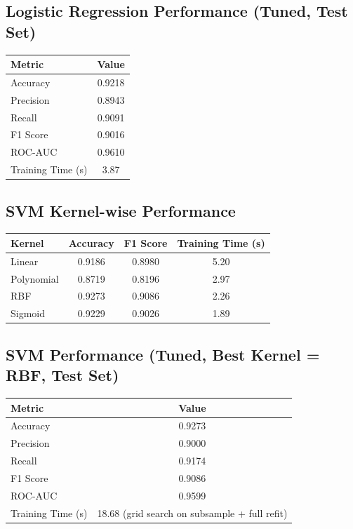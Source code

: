 \documentclass[12pt,a4paper]{article}
\begin{document}
\subsection*{Logistic Regression Performance (Tuned, Test Set)}
\begin{tabular}{lc}
\toprule
Metric & Value\\
\midrule
Accuracy & 0.9218 \\
Precision & 0.8943 \\
Recall & 0.9091 \\
F1 Score & 0.9016 \\
ROC-AUC & 0.9610 \\
Training Time (s) & 3.87 \\
\bottomrule
\end{tabular}

\subsection*{SVM Kernel-wise Performance}
\begin{tabular}{lccc}
\toprule
Kernel & Accuracy & F1 Score & Training Time (s)\\
\midrule
Linear & 0.9186 & 0.8980 & 5.20 \\
Polynomial & 0.8719 & 0.8196 & 2.97 \\
RBF & 0.9273 & 0.9086 & 2.26 \\
Sigmoid & 0.9229 & 0.9026 & 1.89 \\
\bottomrule
\end{tabular}

\subsection*{SVM Performance (Tuned, Best Kernel = RBF, Test Set)}
\begin{tabular}{lc}
\toprule
Metric & Value\\
\midrule
Accuracy & 0.9273 \\
Precision & 0.9000 \\
Recall & 0.9174 \\
F1 Score & 0.9086 \\
ROC-AUC & 0.9599 \\
Training Time (s) & 18.68 (grid search on subsample + full refit) \\
\bottomrule
\end{tabular}
\end{document}
